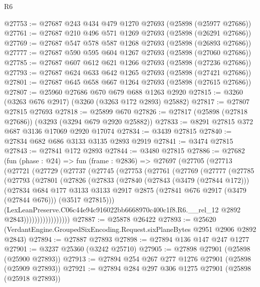\begin{lexlean}{R6}
\begin{coremodule}
@27753 := @27687 @243 @434 @479 @1270 @27693 (@25898 (@25977 @27686))
@27761 := @27687 @210 @496 @571 @1269 @27693 (@25898 (@26291 @27686))
@27769 := @27687 @547 @578 @587 @1268 @27693 (@25898 (@26893 @27686))
@27777 := @27687 @590 @595 @604 @1267 @27693 (@25898 (@27060 @27686))
@27785 := @27687 @607 @612 @621 @1266 @27693 (@25898 (@27236 @27686))
@27793 := @27687 @624 @633 @642 @1265 @27693 (@25898 (@27421 @27686))
@27801 := @27687 @645 @658 @667 @1264 @27693 (@25898 (@27615 @27686))
@27807 := @25960 @27686 @670 @679 @688 @1263 @2920
@27815 := @3260 (@3263 @676 @2917) (@3260 (@3263 @172 @2893) @25882)
@27817 := @27807 @27815 @27693
@27818 := @25899 @670
@27826 := @27817 (@25898 (@27818 @27686)) (@3293 (@3294 @679 @2920 @25882))
@27833 := @8291 @27815 @372 @687 @3136 @17069 @2920 @17074
@27834 := @3439 @27815
@27840 := @27834 @682 @686 @3133 @3135 @2893 @2919
@27841 := @3474 @27815
@27843 := @27841 @172 @2893
@27844 := @3480 @27815
@27886 := @27682
    (fun (phase : @24) =>
    fun (frame : @2836) =>
    @27697
      (@27705
        (@27713
          (@27721
            (@27729
              (@27737
                (@27745
                  (@27753
                    (@27761
                      (@27769
                        (@27777
                          (@27785
                            (@27793
                              (@27801
                                (@27826
                                  (@27833
                                    (@27840
                                      (@27843 (@3479 (@27844 @172)))
                                      (@27834
                                        @684
                                        @177
                                        @3133
                                        @3133
                                        @2917
                                        @2875
                                        (@27841 @676 @2917 (@3479 (@27844 @676)))
                                        (@3517 @27815)))
                                    (LexLeanPreserve.C06c44e94c916022bb6668970c400c1f8.R6.__rel_12
                                      @2892
                                      @2843)))))))))))))))))
@27887 := @25878 @26422
@27893 := @25620 (VerdantEngine.GroupedSixEncoding.Request.sixPlaneBytes @2951 @2906 @2892 @2843)
@27894 := @27887 @27893
@27898 := @27894 @136 @147 @247 @1277
@27901 := @3237 @25360 (@3242 @25710)
@27905 := @27898 @27901 (@25898 (@25900 @27893))
@27913 := @27894 @254 @267 @277 @1276 @27901 (@25898 (@25909 @27893))
@27921 := @27894 @284 @297 @306 @1275 @27901 (@25898 (@25918 @27893))

\end{coremodule}
\end{lexlean}
